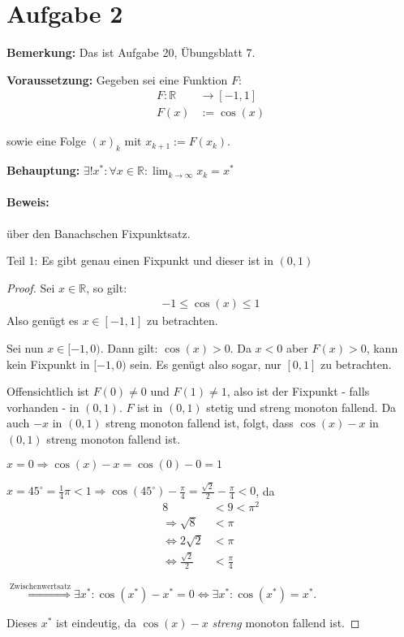 \section*{Aufgabe 2}
\textbf{Bemerkung:}  Das ist Aufgabe 20, Übungsblatt 7.

\textbf{Voraussetzung:} 
Gegeben sei eine Funktion $F$:
\begin{align*}
    F: \mathbb{R} &\rightarrow [-1, 1]\\
    F(x) &:= \cos(x)
\end{align*}

sowie eine Folge $(x)_k$ mit $x_{k+1} := F(x_k)$.

\textbf{Behauptung:} $\displaystyle \exists! x^*: \forall x \in \mathbb{R}: \lim_{k \rightarrow \infty} x_k = x^*$

\paragraph{Beweis:} über den Banachschen Fixpunktsatz.

Teil 1: Es gibt genau einen Fixpunkt und dieser ist in $(0,1)$
\begin{proof}
Sei $ x \in \mathbb{R}$, so gilt:
\begin{align*}
	-1 \leq \cos(x) \leq 1
\end{align*}
Also genügt es $x \in [-1, 1]$ zu betrachten.

Sei nun $x \in [-1, 0)$. Dann gilt: $\cos(x) > 0$. Da $x <0$ aber $F(x) > 0$,
kann kein Fixpunkt in $[-1, 0)$ sein. Es genügt also sogar,
nur $[0, 1]$ zu betrachten.

Offensichtlich ist $F(0) \neq 0$ und $F(1) \neq 1$, also ist der 
Fixpunkt - falls vorhanden - in $(0,1)$. $F$ ist in $(0,1)$ stetig
und streng monoton fallend. Da auch $-x$ in $(0,1)$ streng monoton
fallend ist, folgt, dass $\cos(x) - x$ in $(0,1)$ streng monoton 
fallend ist.

$x=0 \Rightarrow \cos(x) - x = \cos(0) - 0 = 1$

$x=45^\circ = \frac{1}{4} \pi < 1 \Rightarrow \cos(45^\circ) - \frac{\pi}{4} = \frac{\sqrt{2}}{2} - \frac{\pi}{4} <0$, da
\begin{align}
    8 &< 9 < \pi^2\\
    \Rightarrow \sqrt{8} &< \pi\\
    \Leftrightarrow 2 \sqrt{2} &< \pi\\
    \Leftrightarrow \frac{\sqrt{2}}{2} &< \frac{\pi}{4}
\end{align}

$\stackrel{\text{Zwischenwertsatz}}{\Rightarrow} \exists x^*: \cos(x^*) - x^* = 0 \Leftrightarrow \exists x^*: \cos(x^*) = x^*$.

Dieses $x^*$ ist eindeutig, da $\cos(x)-x$ \emph{streng} monoton fallend ist.
\end{proof}

